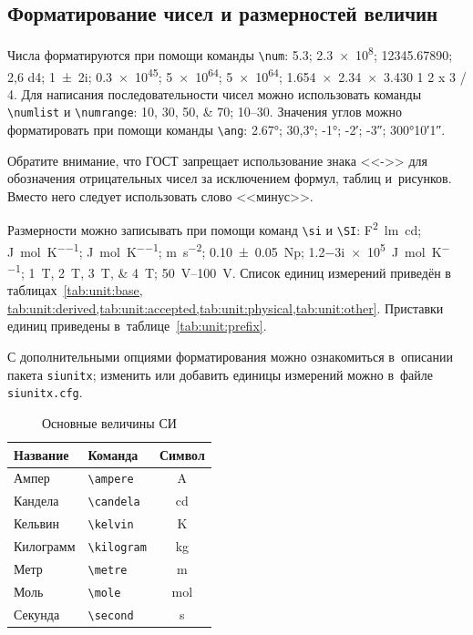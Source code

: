 \subsection{Форматирование чисел и размерностей величин}\label{sec:units}

Числа форматируются при помощи команды \verb|\num|:
\num{5,3};
\num{2,3e8};
\num{12345,67890};
\num{2,6 d4};
\num{1+-2i};
\num{.3e45};
\num[exponent-base=2]{5 e64};
\num[exponent-base=2,exponent-to-prefix]{5 e64};
\num{1.654 x 2.34 x 3.430}
\num{1 2 x 3 / 4}.
Для написания последовательности чисел можно использовать команды \verb|\numlist| и \verb|\numrange|:
\numlist{10;30;50;70}; \numrange{10}{30}.
Значения углов можно форматировать при помощи команды \verb|\ang|:
\ang{2.67};
\ang{30,3};
\ang{-1;;};
\ang{;-2;};
\ang{;;-3};
\ang{300;10;1}.

Обратите внимание, что ГОСТ запрещает использование знака <<->> для обозначения отрицательных чисел
за исключением формул, таблиц и~рисунков.
Вместо него следует использовать слово <<минус>>.

Размерности можно записывать при помощи команд \verb|\si| и \verb|\SI|:
\si{\farad\squared\lumen\candela};
\si{\joule\per\mole\per\kelvin};
\si[per-mode = symbol-or-fraction]{\joule\per\mole\per\kelvin};
\si{\metre\per\second\squared};
\SI{0.10(5)}{\neper};
\SI{1.2-3i e5}{\joule\per\mole\per\kelvin};
\SIlist{1;2;3;4}{\tesla};
\SIrange{50}{100}{\volt}.
Список единиц измерений приведён в таблицах~\cref{tab:unit:base,
    tab:unit:derived,tab:unit:accepted,tab:unit:physical,tab:unit:other}.
Приставки единиц приведены в~таблице~\cref{tab:unit:prefix}.

С дополнительными опциями форматирования можно ознакомиться в~описании пакета \texttt{siunitx};
изменить или добавить единицы измерений можно в~файле \texttt{siunitx.cfg}.

\begin{table}
    \centering
    \captionsetup{justification=centering} %
    \caption{Основные величины СИ}\label{tab:unit:base}
    \begin{tabular}{llc}
        \toprule
        Название  & Команда          & Символ         \\
        \midrule
        Ампер     & \verb|\ampere|   & \si{\ampere}   \\
        Кандела   & \verb|\candela|  & \si{\candela}  \\
        Кельвин   & \verb|\kelvin|   & \si{\kelvin}   \\
        Килограмм & \verb|\kilogram| & \si{\kilogram} \\
        Метр      & \verb|\metre|    & \si{\metre}    \\
        Моль      & \verb|\mole|     & \si{\mole}     \\
        Секунда   & \verb|\second|   & \si{\second}   \\
        \bottomrule
    \end{tabular}
\end{table}

